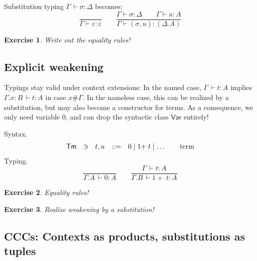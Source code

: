 \documentclass[a4paper,fleqn]{scrartcl}
\newtheorem{exercise}{Exercise}
\newcommand{\der}{\,\vdash}
\newcommand{\ru}[2]{\dfrac{#1}{#2}}
\newcommand{\Var}{\mathsf{Var}}
\newcommand{\Tm}{\mathsf{Tm}}
\newcommand{\GD}{\ensuremath{\Delta}}
\newcommand{\Ge}{\ensuremath{\varepsilon}}
\newcommand{\Gs}{\ensuremath{\sigma}}
\begin{document}
Substitution typing $\Gamma \der \sigma : \Delta$ becomes:
\[
  \ru{}{\Gamma \vdash \Ge : \Ge}
\qquad
  \ru{\Gamma \vdash \Gs : \GD \qquad \Gamma \vdash u : A
     }{\Gamma \vdash (\Gs,u) : (\GD.A)
     }
\]
\begin{exercise}
Write out the equality rules!
\end{exercise}


\subsection{Explicit weakening}

Typings stay valid under context extensions: In the named case, $\Gamma \der t : A$ implies $\Gamma.x{:}B \der t : A$ in case $x \# \Gamma$.  In the nameless case, this can be realized by a substitution, but may also become a constructor for terms.  As a consequence, we only need variable $0$, and can drop the syntactic class $\Var$ entirely!

Syntax.
\[
\begin{array}{lllrl@{\qquad}l}
\Tm & \ni & t,u & ::= & 0 \mid {1+}\;t \mid \dots & \mbox{term} \\
\end{array}
\]
Typing.
\[
  \ru{}{\Gamma.A \der 0 : A}
\qquad
  \ru{\Gamma \der t : A}{\Gamma.B \der {1+}\; t : A}
\]
\begin{exercise}
Equality rules!
\end{exercise}
\begin{exercise}
Realize weakening by a substitution!
\end{exercise}


\subsection{CCCs: Contexts as products, substitutions as tuples}
\end{document}
